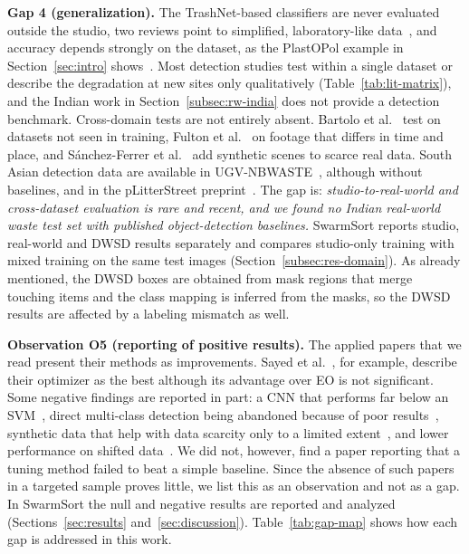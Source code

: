 \textbf{Gap 4 (generalization).} The TrashNet-based classifiers are never evaluated outside the studio, two reviews point to simplified, laboratory-like data~\cite{lu2022computer,fang2023artificial}, and accuracy depends strongly on the dataset, as the PlastOPol example in Section~\ref{sec:intro} shows~\cite{cordova2022litter}. Most detection studies test within a single dataset or describe the degradation at new sites only qualitatively (Table~\ref{tab:lit-matrix}), and the Indian work in Section~\ref{subsec:rw-india} does not provide a detection benchmark. Cross-domain tests are not entirely absent. Bartolo et al.~\cite{bartolo2025learning} test on datasets not seen in training, Fulton et al.~\cite{fulton2019robotic} on footage that differs in time and place, and S\'{a}nchez-Ferrer et al.~\cite{sanchezferrer2023experimental} add synthetic scenes to scarce real data. South Asian detection data are available in UGV-NBWASTE~\cite{isalm2025ugvnbwaste}, although without baselines, and in the pLitterStreet preprint~\cite{mandhati2024plitterstreet}. The gap is: \emph{studio-to-real-world and cross-dataset evaluation is rare and recent, and we found no Indian real-world waste test set with published object-detection baselines.} SwarmSort reports studio, real-world and DWSD results separately and compares studio-only training with mixed training on the same test images (Section~\ref{subsec:res-domain}). As already mentioned, the DWSD boxes are obtained from mask regions that merge touching items and the class mapping is inferred from the masks, so the DWSD results are affected by a labeling mismatch as well.

\textbf{Observation O5 (reporting of positive results).} The applied papers that we read present their methods as improvements. Sayed et al.~\cite{sayed2024intelligent}, for example, describe their optimizer as the best although its advantage over EO is not significant. Some negative findings are reported in part: a CNN that performs far below an SVM~\cite{yang2016classification}, direct multi-class detection being abandoned because of poor results~\cite{majchrowska2022deep}, synthetic data that help with data scarcity only to a limited extent~\cite{sanchezferrer2023experimental}, and lower performance on shifted data~\cite{fulton2019robotic,liao2022realtime}. We did not, however, find a paper reporting that a tuning method failed to beat a simple baseline. Since the absence of such papers in a targeted sample proves little, we list this as an observation and not as a gap. In SwarmSort the null and negative results are reported and analyzed (Sections~\ref{sec:results} and~\ref{sec:discussion}). Table~\ref{tab:gap-map} shows how each gap is addressed in this work.

